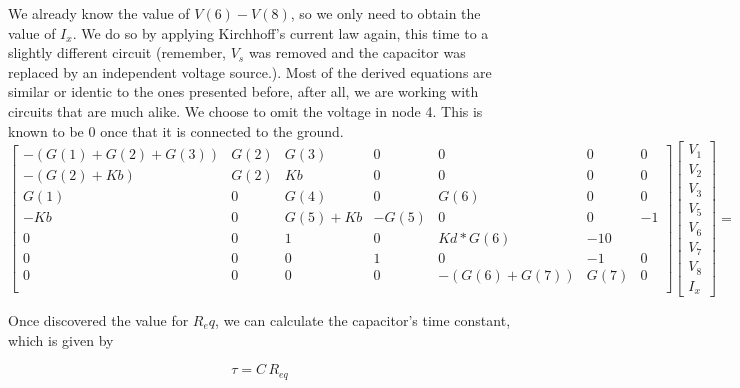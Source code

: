 We already know the value of $V(6)-V(8)$, so we only need to obtain the value of $I_x$. We do so by applying Kirchhoff's current law again, this time to a slightly different circuit (remember, $V_s$ was removed and the capacitor was replaced by an independent voltage source.). Most of the derived equations are similar or identic to the ones presented before, after all, we are working with circuits that are much alike. We choose to omit the voltage in node 4. This is known to be 0 once that it is connected to the ground.
\begin{equation*}
\begin{bmatrix}
  -(G(1)+G(2)+G(3))&  G(2) &  G(3)&        0&       0&        0&        0\\
  -(G(2)+Kb)&       G(2)&    Kb&           0&       0&         0&             0\\
 G(1)&          0&     G(4)&         0&      G(6)&           0&           0\\
  -Kb&                 0&     G(5)+Kb&      -G(5)&    0&     0&           -1\\
   0&       0&             1&           0&       Kd*G(6)&      -1               0\\
   0&       0&         0&          1&             0&             -1&       0\\
   0&      0&     0&           0&       -(G(6)+G(7))&       G(7)&      0\\



\end{bmatrix}
 \begin{bmatrix} V_1\\V_2\\V_3\\V_5\\V_6\\V_7\\V_8\\I_x \end{bmatrix} =
 \begin{bmatrix} 0 \\ 0 \\ 0 \\ 0 \\ 0 \\ V_6-V_8 \\ 0\end{bmatrix}
\end{equation*}

Once discovered the value for $R_eq$, we can calculate the capacitor's time constant, which is given by
 \begin{center}
\begin{equation}
\tau=C\,R_{eq}
\label{time_constant}
\end{equation}
\end{center}

